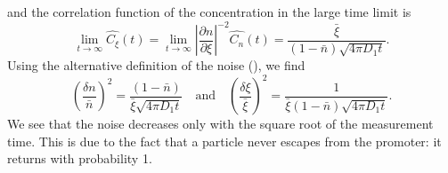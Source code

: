 and the correlation function of the concentration in the large time limit is
\begin{equation}
 \lim_{t \rightarrow \infty} \hat{C_{\xi}}(t) = \lim_{t \rightarrow \infty} \left| \frac{\partial n}{\partial \xi} \right|^{-2} \hat{C_n}(t) = \frac{\bar{\xi}}{(1 - \bar{n}) \sqrt{4 \pi D_1 t}}.
\end{equation}
Using the alternative definition of the noise (), we find
\begin{equation}
 \left( \frac{\delta n}{\bar{n}} \right)^2 =  \frac{(1-\bar{n})}{\bar{\xi} \sqrt{4 \pi D_1 t}} \quad \text{and} \quad \left( \frac{\delta \xi}{\bar{\xi}} \right)^2 = \frac{1}{ \bar{\xi} (1 - \bar{n}) \sqrt{4 \pi D_1 t}}.
\end{equation}
We see that the noise decreases only with the square root of the measurement time. This is due to the fact that a particle never escapes from the promoter: it returns with probability 1.

